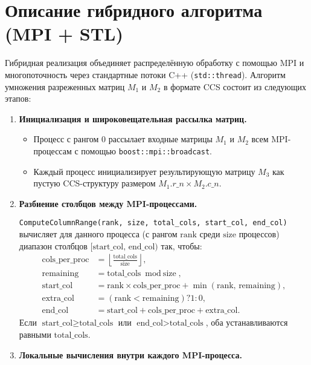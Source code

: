 \documentclass[12pt]{article}
\begin{document}
\section{Описание гибридного алгоритма (MPI + STL)}

Гибридная реализация объединяет распределённую обработку с помощью MPI и многопоточность через стандартные потоки C++ (\texttt{std::thread}). Алгоритм умножения разреженных матриц \(M_1\) и \(M_2\) в формате CCS состоит из следующих этапов:

\begin{enumerate}
    \item \textbf{Инициализация и широковещательная рассылка матриц.}
    \begin{itemize}
        \item Процесс с рангом 0 рассылает входные матрицы \(M_1\) и \(M_2\) всем MPI-процессам с помощью \texttt{boost::mpi::broadcast}.
        \item Каждый процесс инициализирует результирующую матрицу \(M_3\) как пустую CCS-структуру размером \(M_1.r\_n \times M_2.c\_n\).
    \end{itemize}

    \item \textbf{Разбиение столбцов между MPI-процессами.}
    
    \texttt{ComputeColumnRange(rank, size, total\_cols, start\_col, end\_col)} вычисляет для данного процесса (с рангом \(\text{rank}\) среди \(\text{size}\) процессов) диапазон столбцов \([\text{start\_col},\,\text{end\_col})\) так, чтобы:
    \[
        \begin{aligned}
            \text{cols\_per\_proc} &= \left\lfloor \tfrac{\text{total\_cols}}{\text{size}} \right\rfloor, \\
            \text{remaining}    &= \text{total\_cols} \bmod \text{size}, \\
            \text{start\_col}   &= \text{rank} \times \text{cols\_per\_proc} + \min(\text{rank},\,\text{remaining}), \\
            \text{extra\_col}   &= (\text{rank} < \text{remaining}) ? 1 : 0, \\
            \text{end\_col}     &= \text{start\_col} + \text{cols\_per\_proc} + \text{extra\_col}.
        \end{aligned}
    \]
    Если \(\text{start\_col} \ge \text{total\_cols}\) или \(\text{end\_col} > \text{total\_cols}\), оба устанавливаются равными \(\text{total\_cols}\).

    \item \textbf{Локальные вычисления внутри каждого MPI-процесса.}
    

\end{enumerate}
\end{document}

